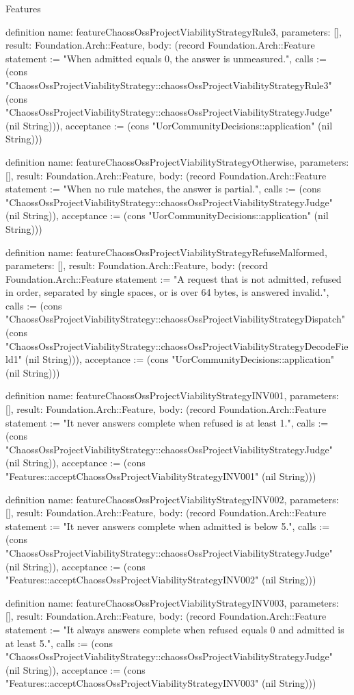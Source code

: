 \begin{lexlean}{Features}
\begin{semanticmodule}
definition{
  name: featureChaossOssProjectViabilityStrategyRule3,
  parameters: [],
  result: Foundation.Arch::Feature,
  body: (record Foundation.Arch::Feature {statement := "When admitted equals 0, the answer is unmeasured.", calls := (cons "ChaossOssProjectViabilityStrategy::chaossOssProjectViabilityStrategyRule3" (cons "ChaossOssProjectViabilityStrategy::chaossOssProjectViabilityStrategyJudge" (nil String))), acceptance := (cons "UorCommunityDecisions::application" (nil String))})
}

definition{
  name: featureChaossOssProjectViabilityStrategyOtherwise,
  parameters: [],
  result: Foundation.Arch::Feature,
  body: (record Foundation.Arch::Feature {statement := "When no rule matches, the answer is partial.", calls := (cons "ChaossOssProjectViabilityStrategy::chaossOssProjectViabilityStrategyJudge" (nil String)), acceptance := (cons "UorCommunityDecisions::application" (nil String))})
}

definition{
  name: featureChaossOssProjectViabilityStrategyRefuseMalformed,
  parameters: [],
  result: Foundation.Arch::Feature,
  body: (record Foundation.Arch::Feature {statement := "A request that is not admitted, refused in order, separated by single spaces, or is over 64 bytes, is answered invalid.", calls := (cons "ChaossOssProjectViabilityStrategy::chaossOssProjectViabilityStrategyDispatch" (cons "ChaossOssProjectViabilityStrategy::chaossOssProjectViabilityStrategyDecodeField1" (nil String))), acceptance := (cons "UorCommunityDecisions::application" (nil String))})
}

definition{
  name: featureChaossOssProjectViabilityStrategyINV001,
  parameters: [],
  result: Foundation.Arch::Feature,
  body: (record Foundation.Arch::Feature {statement := "It never answers complete when refused is at least 1.", calls := (cons "ChaossOssProjectViabilityStrategy::chaossOssProjectViabilityStrategyJudge" (nil String)), acceptance := (cons "Features::acceptChaossOssProjectViabilityStrategyINV001" (nil String))})
}

definition{
  name: featureChaossOssProjectViabilityStrategyINV002,
  parameters: [],
  result: Foundation.Arch::Feature,
  body: (record Foundation.Arch::Feature {statement := "It never answers complete when admitted is below 5.", calls := (cons "ChaossOssProjectViabilityStrategy::chaossOssProjectViabilityStrategyJudge" (nil String)), acceptance := (cons "Features::acceptChaossOssProjectViabilityStrategyINV002" (nil String))})
}

definition{
  name: featureChaossOssProjectViabilityStrategyINV003,
  parameters: [],
  result: Foundation.Arch::Feature,
  body: (record Foundation.Arch::Feature {statement := "It always answers complete when refused equals 0 and admitted is at least 5.", calls := (cons "ChaossOssProjectViabilityStrategy::chaossOssProjectViabilityStrategyJudge" (nil String)), acceptance := (cons "Features::acceptChaossOssProjectViabilityStrategyINV003" (nil String))})
}


\end{semanticmodule}
\end{lexlean}
